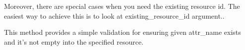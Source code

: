 \documentclass[letterpaper,10pt,english]{sphinxmanual}
\begin{document}
\begin{fulllineitems}
\begin{fulllineitems}
Moreover, there are special cases when you need the existing resource id. The easiest way to achieve this is to look at
existing\_resource\_id argument..

\end{fulllineitems}


\begin{fulllineitems}
\label{features/roa/technical_summary:fantastico.roa.resource_validator.ResourceValidator.validate_missing_attr}
This method provides a simple validation for ensuring given attr\_name exists and it's not empty into the specified
resource.

\end{fulllineitems}


\end{fulllineitems}

\end{document}
